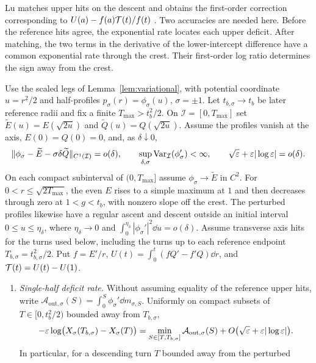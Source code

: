 Lu matches upper hits on the descent and obtains the first-order
correction corresponding to $U(a)-f(a)\mathcal{T}(t)/f(t)$
\cite[supplement, p.~16, (S5.12)--(S5.13)]{LuDegree}.
Two accuracies are needed here. Before the reference hits agree, the
exponential rate locates each upper deficit. After matching, the two
terms in the derivative of the lower-intercept difference have a
common exponential rate through the crest. Their first-order log
ratio determines the sign away from the crest.

\begin{lemma}\label{lem:common-crest}
Use the scaled legs of Lemma~\ref{lem:variational}, with potential
coordinate $u=r^2/2$ and half-profiles $p_\sigma(r)=\phi_\sigma(u)$,
$\sigma=\pm1$. Let $t_{b,\sigma}\to t_b$ be later reference radii and
fix a finite $T_{\max}>t_b^2/2$. On $\mathcal I=[0,T_{\max}]$ set
$\widetilde E(u)=E(\sqrt{2u})$ and $\widetilde Q(u)=Q(\sqrt{2u})$.
Assume the profiles vanish at the axis, $E(0)=Q(0)=0$, and, as $\delta\downarrow0$,
\[
 \|\phi_\sigma-\widetilde E-\sigma\delta\widetilde Q\|_{C^1(\mathcal I)}
     =o(\delta),\qquad
 \sup_{\delta,\sigma}\operatorname{Var}_{\mathcal I}(\phi_\sigma')<\infty,
 \qquad \sqrt{\varepsilon}+\varepsilon|\log\varepsilon|=o(\delta).
\]
On each compact subinterval of $(0,T_{\max}]$ assume
$\phi_\sigma\to\widetilde E$ in $C^2$.
For $0<r\le\sqrt{2T_{\max}}$, the even $E$ rises to a simple maximum
at $1$ and then decreases through zero at $1<g<t_b$, with nonzero
slope off the crest. The perturbed profiles likewise have a regular
ascent and descent outside an initial interval $0\le u\le\eta_\delta$,
where $\eta_\delta\to0$ and
$\int_0^{\eta_\delta}|\phi_\sigma'|^2\dd u=o(\delta)$.
Assume transverse axis hits for the turns used below, including the turns
up to each reference endpoint $T_{b,\sigma}=t_{b,\sigma}^2/2$.
Put $f=E'/r$, $U(t)=\int_0^t(fQ'-f'Q)\dd r$, and $\mathcal{T}(t)=U(t)-U(1)$.
\begin{enumerate}
  \item[\textup{(i)}] \emph{Single-half deficit rate.} Without assuming
  equality of the reference upper hits, write
  $\mathcal A_{\mathrm{out},\sigma}(S)=\int_0^S \phi_\sigma'\dd m_{\sigma,S}$.
  Uniformly on compact subsets of $T\in[0,t_b^2/2)$ bounded away from $T_{b,\sigma}$,
  \[
    -\varepsilon\log\bigl(X_\sigma(T_{b,\sigma})-X_\sigma(T)\bigr)
    = \min_{S\in[T,T_{b,\sigma}]} \mathcal A_{\mathrm{out},\sigma}(S)
      + O\bigl(\sqrt{\varepsilon}+\varepsilon|\log\varepsilon|\bigr).
  \]
  In particular, for a descending turn $T$ bounded away from the perturbed

\end{enumerate}
\end{lemma}
